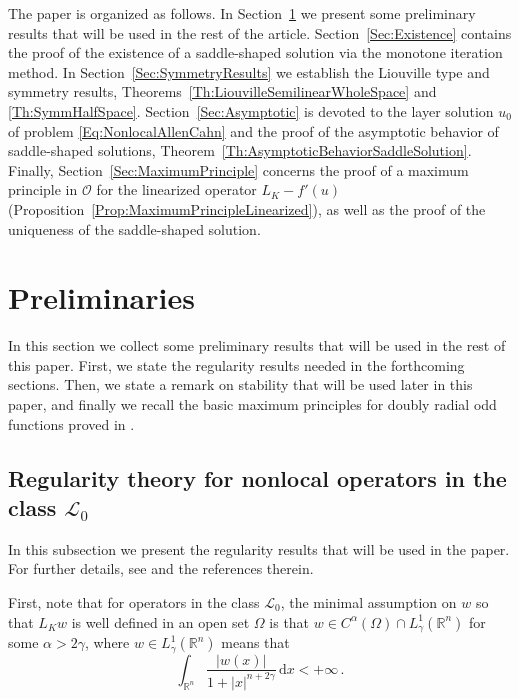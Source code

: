 \documentclass[12pt,reqno]{amsart}
\theoremstyle{definition}
\theoremstyle{remark}
\newcommand{\con}[1]{\mathbb{#1}}
\newcommand{\R}{\con{R}} %
\newcommand{\lcal}{\mathcal{L}}
\newcommand{\ocal}{\mathcal{O}}
\newcommand{\s}{\gamma}
\renewcommand{\d}{\,\mathrm{d}} %
\numberwithin{equation}{section}
\begin{document}
The paper is organized as follows. In Section~\ref{Sec:Preliminaries} we present some preliminary results that will be used in the rest of the article. Section~\ref{Sec:Existence} contains the proof of the existence of a saddle-shaped solution via the monotone iteration method. In Section~\ref{Sec:SymmetryResults} we establish the Liouville type and symmetry results, Theorems~\ref{Th:LiouvilleSemilinearWholeSpace} and \ref{Th:SymmHalfSpace}. Section~\ref{Sec:Asymptotic} is devoted to the layer solution $u_0$ of problem \eqref{Eq:NonlocalAllenCahn} and the proof of the asymptotic behavior of saddle-shaped solutions, Theorem~\ref{Th:AsymptoticBehaviorSaddleSolution}. Finally, Section~\ref{Sec:MaximumPrinciple} concerns the proof of a maximum principle in $\ocal$ for the linearized operator $L_K - f'(u)$ (Proposition~\ref{Prop:MaximumPrincipleLinearized}), as well as the proof of the uniqueness of the saddle-shaped solution.

\section{Preliminaries}
\label{Sec:Preliminaries}

In this section we collect some preliminary results that will be used in the rest of this paper. First, we state the regularity results needed in the forthcoming sections. Then, we state a remark on stability that will be used later in this paper, and finally we recall the basic maximum principles for doubly radial odd functions proved in \cite{FelipeSanz-Perela:IntegroDifferentialI}.



\subsection{Regularity theory for nonlocal operators in the class $\lcal_0$}
\label{Subsec:Regularity}


In this subsection we present the regularity results that will be used in the paper. For further details, see \cite{RosOton-Survey,SerraC2s+alphaRegularity} and the references therein. 

First, note that for operators in the class $\lcal_0$, the minimal assumption on $w$ so that $L_K w$ is well defined in an open set $\Omega$ is that $w\in C^\alpha (\Omega)\cap L^1_\s(\R^n)$ for some $\alpha > 2\s$, where $w\in L^1_\s(\R^n)$ means that
$$
\int_{\R^n} \dfrac{|w(x)|}{1+|x|^{n+2\s}}\d x < +\infty\,.
$$
\end{document}
